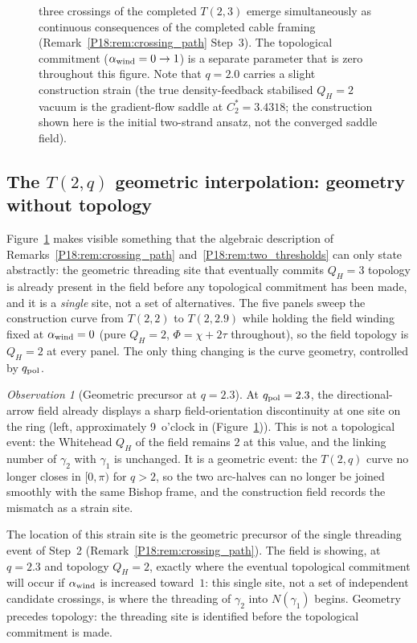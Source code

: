 \documentclass[11pt,a4paper]{article}
\theoremstyle{definition}\newtheorem{definition}[theorem]{Definition}
\theoremstyle{remark}
\newtheorem{observation}[theorem]{Observation}
\newcommand{\QH}{Q_H}
\begin{document}
\begin{figure}[htp]
{    three crossings of the completed $T(2,3)$ emerge simultaneously
    as continuous consequences of the completed cable framing
    (Remark~\ref{P18:rem:crossing_path} Step~3).  The topological
    commitment ($\alpha_{\rm wind}=0\to1$) is a separate parameter
    that is zero throughout this figure.  Note that $q=2.0$
    carries a slight construction strain (the true density-feedback
    stabilised $\QH=2$ vacuum is the gradient-flow saddle at
    $C_2^*=3.4318$; the construction shown here is the initial
    two-strand ansatz, not the converged saddle field).}
    \label{P18:fig:qpol_sweep}
\end{figure}

\subsection{The $T(2,q)$ geometric interpolation: geometry without topology}
\label{P18:sec:twoq_interpolation}

Figure~\ref{P18:fig:qpol_sweep} makes visible something that the algebraic
description of Remarks~\ref{P18:rem:crossing_path} and~\ref{P18:rem:two_thresholds}
can only state abstractly: the geometric threading site that
eventually commits $\QH=3$ topology is already present in the field
before any topological commitment has been made, and it is a
\emph{single} site, not a set of alternatives.  The five panels
sweep the construction curve from $T(2,2)$ to $T(2,2.9)$ while
holding the field winding fixed at $\alpha_{\rm wind}=0$ (pure
$\QH=2$, $\Phi=\chi+2\tau$ throughout), so the field topology is
$\QH=2$ at every panel.  The only thing changing is the curve
geometry, controlled by $q_{\rm pol}$.

\begin{observation}[Geometric precursor at $q=2.3$]
\label{P18:obs:precursor}
At $q_{\rm pol}=2.3$, the directional-arrow field already displays a
sharp field-orientation discontinuity at one site on the ring (left,
approximately 9~o'clock in (Figure~\ref{P18:fig:qpol_sweep})).
This is not a topological event: the Whitehead $\QH$ of the field remains
$2$ at this value, and the linking number of $\gamma_2$ with $\gamma_1$ is
unchanged.  It is a geometric event: the $T(2,q)$ curve no longer
closes in $[0,\pi)$ for $q>2$, so the two arc-halves can no longer
be joined smoothly with the same Bishop frame, and the construction
field records the mismatch as a strain site.

The location of this strain site is the geometric precursor of the
single threading event of Step~2 (Remark~\ref{P18:rem:crossing_path}).
The field is showing, at $q=2.3$ and topology $\QH=2$, exactly where
the eventual topological commitment will occur if $\alpha_{\rm wind}$
is increased toward~$1$: this single site, not a set of independent
candidate crossings, is where the threading of $\gamma_2$ into
$N(\gamma_1)$ begins.  Geometry precedes topology: the threading
site is identified before the topological commitment is made.
\end{observation}
\end{document}
